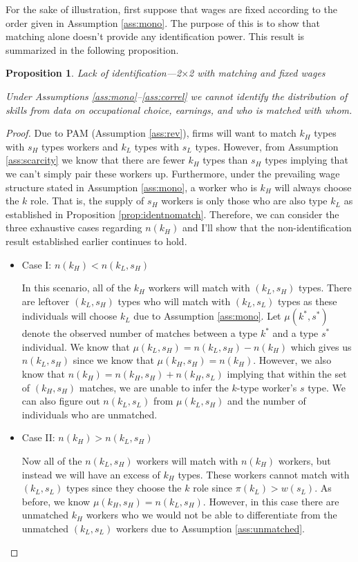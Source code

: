 \documentclass[12 pt]{article}
\newtheorem{proposition}{Proposition} %
\begin{document}
For the sake of illustration, first suppose that wages are fixed according to the order given in Assumption \ref{ass:mono}. The purpose of this is to show that matching alone doesn't provide any identification power. This result is summarized in the following proposition.
\begin{proposition}{Lack of identification---2$\times$2 with matching and fixed wages}
	
	Under Assumptions \ref{ass:mono}--\ref{ass:correl} we cannot identify the distribution of skills from data on occupational choice, earnings, and who is matched with whom. 
	\label{prop:noidentmatch}
\end{proposition}
\begin{proof}
	Due to PAM (Assumption \ref{ass:rev}), firms will want to match $k_H$ types with $s_H$ types workers and $k_L$ types with $s_L$ types. However, from Assumption \ref{ass:scarcity} we know that there are fewer $k_H$ types than $s_H$ types implying that we can't simply pair these workers up. Furthermore, under the prevailing wage structure stated in Assumption \ref{ass:mono}, a worker who is $k_H$ will always choose the $k$ role. That is, the supply of $s_H$ workers is only those who are also type $k_L$ as established in Proposition \ref{prop:identnomatch}. Therefore, we can consider the three exhaustive cases regarding $n(k_H)$ and I'll show that the non-identification result established earlier continues to hold. 
	\begin{itemize}
		\item Case I: $n(k_H) < n(k_L,s_H)$
		
		In this scenario, all of the $k_H$ workers will match with $(k_L,s_H)$ types. There are leftover $(k_L,s_H)$ types who will match with $(k_L,s_L)$ types as these individuals will choose $k_L$ due to Assumption \ref{ass:mono}. Let $\mu(k^*,s^*)$ denote the observed number of matches between a type $k^*$ and a type $s^*$ individual. We know that $\mu(k_L,s_H) = n(k_L,s_H)-n(k_H)$ which gives us $n(k_L,s_H)$ since we know that $\mu(k_H,s_H) = n(k_H)$. However, we also know that $n(k_H) = n(k_H,s_H) + n(k_H,s_L)$ implying that within the set of $(k_H,s_H)$ matches, we are unable to infer the $k$-type worker's $s$ type. We can also figure out $n(k_L,s_L)$ from $\mu(k_L,s_H)$ and the number of individuals who are unmatched. 
		
		\item Case II: $n(k_H) > n(k_L,s_H)$
		
		Now all of the $n(k_L,s_H)$ workers will match with $n(k_H)$ workers, but instead we will have an excess of $k_H$ types. These workers cannot match with $(k_L,s_L)$ types since they choose the $k$ role since $\pi(k_L)>w(s_L)$. As before, we know $\mu(k_H,s_H)=n(k_L,s_H)$. However, in this case there are unmatched $k_H$ workers who we would  not be able to differentiate from the unmatched $(k_L,s_L)$ workers due to Assumption \ref{ass:unmatched}.
		

\end{itemize}
\end{proof}
\end{document}
